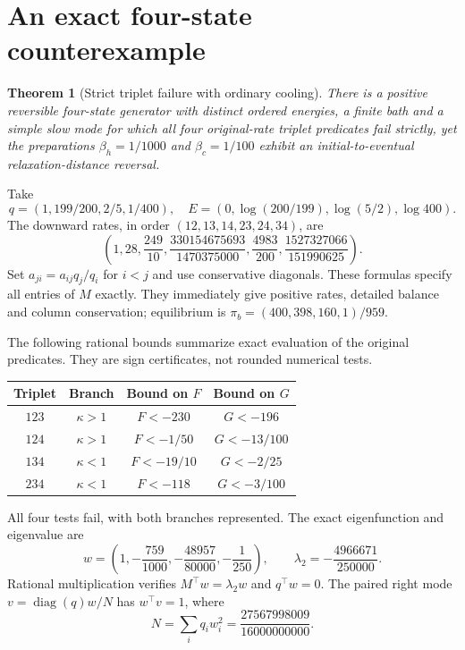 \documentclass[11pt]{article}
\newtheorem{theorem}{Theorem}
\newcommand{\diag}{\operatorname{diag}}
\begin{document}
\section{An exact four-state counterexample}\label{sec:witness}
\begin{theorem}[Strict triplet failure with ordinary cooling]\label{thm:witness}
There is a positive reversible four-state generator with distinct ordered
energies, a finite bath and a simple slow mode for which all four
original-rate triplet predicates fail strictly, yet the preparations
$\beta_h=1/1000$ and $\beta_c=1/100$ exhibit an initial-to-eventual
relaxation-distance reversal.
\end{theorem}
Take
\begin{equation}\label{eq:witnessdata}
 q=(1,199/200,2/5,1/400),\quad
 E=(0,\log(200/199),\log(5/2),\log400).
\end{equation}
The downward rates, in order $(12,13,14,23,24,34)$, are
\begin{equation}\label{eq:rates}
 \left(1,28,\frac{249}{10},
 \frac{330154675693}{1470375000},\frac{4983}{200},
 \frac{1527327066}{151990625}\right).
\end{equation}
Set $a_{ji}=a_{ij}q_j/q_i$ for $i<j$ and use conservative diagonals.
These formulas specify all entries of $M$ exactly. They immediately give
positive rates, detailed balance and column conservation; equilibrium is
$\pi_b=(400,398,160,1)/959$.

The following rational bounds summarize exact evaluation of the original
predicates. They are sign certificates, not rounded numerical tests.
\begin{center}
\begin{tabular}{cccc}
\toprule Triplet & Branch & Bound on $F$ & Bound on $G$\\\midrule
$123$ & $\kappa>1$ & $F<-230$ & $G<-196$\\
$124$ & $\kappa>1$ & $F<-1/50$ & $G<-13/100$\\
$134$ & $\kappa<1$ & $F<-19/10$ & $G<-2/25$\\
$234$ & $\kappa<1$ & $F<-118$ & $G<-3/100$\\\bottomrule
\end{tabular}
\end{center}
All four tests fail, with both branches represented. The exact
eigenfunction and eigenvalue are
\begin{equation}\label{eq:eigenpair}
 w=\left(1,-\frac{759}{1000},-\frac{48957}{80000},-\frac1{250}\right),
 \qquad \lambda_2=-\frac{4966671}{250000}.
\end{equation}
Rational multiplication verifies $M^\top w=\lambda_2w$ and $q^\top w=0$.
The paired right mode $v=\diag(q)w/N$ has $w^\top v=1$, where
\[
N=\sum_iq_iw_i^2=\frac{27567998009}{16000000000}.
\]
\end{document}
